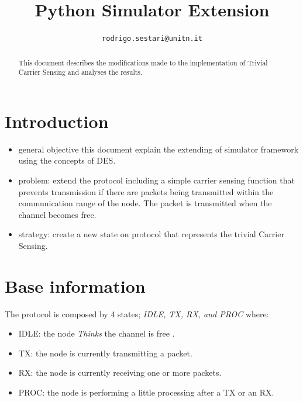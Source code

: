 \documentclass[conference]{IEEEtran}
\begin{document}
\title{Python Simulator Extension}

\author{
	\texttt{rodrigo.sestari@unitn.it}
}

\maketitle

\begin{abstract}
This document describes the modifications made to the implementation of Trivial Carrier Sensing and analyses the results.

\end{abstract}

\acresetall

\section{Introduction}
\label{sec:introduction}

\begin{itemize}
\item general objective this document explain the  extending of  simulator framework using the concepts of DES.
\item problem: extend the protocol including a simple carrier sensing function that prevents transmission if there are packets being transmitted within the communication range of the node. The packet is transmitted when the channel becomes free.
\item strategy: create a new state on protocol that represents the trivial Carrier Sensing.
\end{itemize}

\section{Base information}

The protocol is composed by 4 states;\textit{ IDLE, TX, RX, and PROC} where: 
\begin{itemize}
\item IDLE: the node \textit{Thinks} the channel is free	.
\item TX: the node is currently transmitting a packet.
\item RX: the node is currently receiving one or more packets. 
\item PROC: the node is performing a little processing after a TX or an RX.
\end{itemize}
\end{document}
